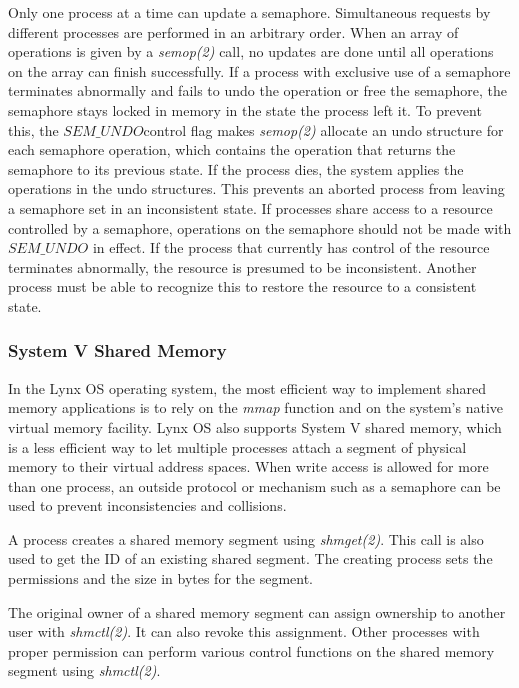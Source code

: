 \documentclass[12pt]{article}
\begin{document}
Only one process at a time can update a semaphore. Simultaneous requests by different processes are performed in an arbitrary order. When an array of operations is given by a \emph{semop(2)} call, no updates are done until all operations on the array can finish successfully.
If a process with exclusive use of a semaphore terminates abnormally and fails to undo the operation or free the semaphore, the semaphore stays locked in memory in the state the process left it. To prevent this, the $SEM\_UNDO $control flag makes \emph{semop(2)} allocate an undo structure for each semaphore operation, which contains the operation that returns the semaphore to its previous state. If the process dies, the system applies the operations in the undo structures. This prevents an aborted process from leaving a semaphore set in an inconsistent state.
If processes share access to a resource controlled by a semaphore, operations on the semaphore should not be made with $SEM\_UNDO$ in effect. If the process that currently has control of the resource terminates abnormally, the resource is presumed to be inconsistent. Another process must be able to recognize this to restore the resource to a consistent state.


\subsubsection{System V Shared Memory}

In the Lynx OS operating system, the most efficient way to implement shared memory applications is to rely on the \emph{mmap} function and on the system's native virtual memory facility. 
Lynx OS also supports System V shared memory, which is a less efficient way to let multiple processes attach a segment of physical memory to their virtual address spaces. When write access is allowed for more than one process, an outside protocol or mechanism such as a semaphore can be used to prevent inconsistencies and collisions.

A process creates a shared memory segment using \emph{shmget(2)}. This call is also used to get the ID of an existing shared segment. The creating process sets the permissions and the size in bytes for the segment.

The original owner of a shared memory segment can assign ownership to another user with \emph{shmctl(2)}. It can also revoke this assignment. Other processes with proper permission can perform various control functions on the shared memory segment using \emph{shmctl(2)}.
\end{document}
